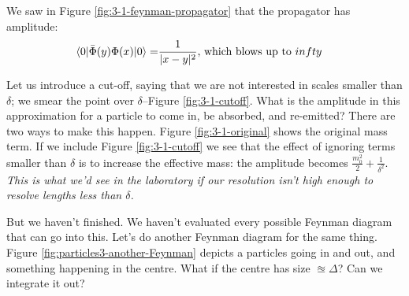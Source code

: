 \documentclass[]{article}
\begin{document}
We saw in Figure \ref{fig:3-1-feynman-propagator} that the propagator has amplitude:
\begin{align*}
	\braket{0|\bar{\Phi}(y)\Phi(x)|0}=&\frac{1}{|x-y|^2}\text{, which blows up to $infty$}
\end{align*}

Let us introduce a cut-off, saying that we are not interested in scales smaller than $\delta$; we smear the point over $\delta$--Figure \ref{fig:3-1-cutoff}. What is the amplitude in this approximation for a particle to come in, be absorbed, and re-emitted? There are two ways to make this happen. Figure \ref{fig:3-1-original} shows the original mass term. If we include Figure \ref{fig:3-1-cutoff} we see that the effect of ignoring terms smaller than $\delta$ is to increase the effective mass: the amplitude becomes $\frac{m_0^2}{2}+\frac{1}{\delta^2}$.  \emph{This is what we'd see in the laboratory if our resolution isn't high enough to resolve lengths less than $\delta$.}  

But we haven't finished. We haven't evaluated every possible Feynman diagram that can go into this. Let's do another Feynman diagram for the same thing. Figure \ref{fig:particles3-another-Feynman} depicts a particles going in and out, and something happening in the centre. What if the centre has size $\approxeq \Delta$? Can we integrate it out?
\end{document}
